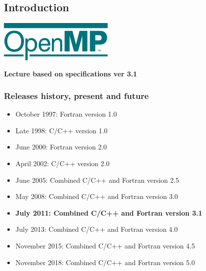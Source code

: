 	\subsection{Introduction}


\begin{frame}
  \begin{center}
    {\includegraphics[height=2cm]{Day1/images/logo_OpenMP.png}}

    \textbf{Lecture based on specifications ver 3.1}

  \end{center}
\end{frame}

\begin{frame}
  \frametitle{Releases history, present and future}
  \begin{itemize}
  \item{October 1997: Fortran version 1.0 }
  \item{Late 1998: C/C++ version 1.0 }
  \item{June 2000: Fortran version 2.0 }
  \item{April 2002: C/C++ version 2.0 }
  \item{June 2005: Combined C/C++ and Fortran version 2.5 }
  \item{May 2008: Combined C/C++ and Fortran version  3.0}
  \item{\textbf{July 2011: Combined C/C++ and Fortran version  3.1}}
  \item{July 2013: Combined C/C++ and Fortran version 4.0 }
  \item{November 2015: Combined C/C++ and Fortran version 4.5 }
  \item{November 2018: Combined C/C++ and Fortran version 5.0 }
  \end{itemize}
\end{frame}



